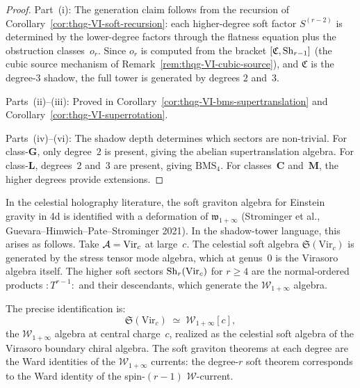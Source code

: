 \begin{proof}
Part~(i): The generation claim follows from the recursion of
Corollary~\ref{cor:thqg-VI-soft-recursion}: each higher-degree
soft factor $S^{(r-2)}$ is determined by the lower-degree factors
through the flatness equation plus the obstruction
classes~$o_r$. Since $o_r$ is computed from the bracket
$[\mathfrak{C}, \operatorname{Sh}_{r-1}]$ (the cubic source mechanism of
Remark~\ref{rem:thqg-VI-cubic-source}), and $\mathfrak{C}$ is
the degree-$3$ shadow, the full tower is generated by degrees $2$
and~$3$.

Parts~(ii)--(iii): Proved in
Corollary~\ref{cor:thqg-VI-bms-supertranslation} and
Corollary~\ref{cor:thqg-VI-superrotation}.

Parts~(iv)--(vi): The shadow depth determines which sectors are
non-trivial. For class-$\mathbf{G}$, only degree~$2$ is present,
giving the abelian supertranslation algebra. For
class-$\mathbf{L}$, degrees~$2$ and~$3$ are present, giving
$\mathrm{BMS}_4$. For classes~$\mathbf{C}$ and~$\mathbf{M}$,
the higher degrees provide extensions.
\end{proof}

\begin{remark}
\label{rem:thqg-VI-w-infinity}
In the celestial holography literature, the soft graviton algebra
for Einstein gravity in 4d is identified with a deformation of
$\mathfrak{w}_{1+\infty}$ (Strominger et al.,
Guevara--Himwich--Pate--Strominger 2021). In the shadow-tower
language, this arises as follows. Take $\mathcal{A} = \mathrm{Vir}_c$
at large~$c$. The celestial soft algebra $\mathfrak{S}(\mathrm{Vir}_c)$
is generated by the stress tensor mode algebra, which at genus~$0$
is the Virasoro algebra itself. The higher soft sectors
$\operatorname{Sh}_r(\mathrm{Vir}_c)$ for $r \geq 4$ are the normal-ordered
products $:T^{r-1}:$ and their descendants, which generate the
$\mathcal{W}_{1+\infty}$ algebra.

The precise identification is:
\begin{equation}\label{eq:thqg-VI-w-infinity-identification}
\mathfrak{S}(\mathrm{Vir}_c)
\;\simeq\;
\mathcal{W}_{1+\infty}[c],
\end{equation}
the $\mathcal{W}_{1+\infty}$ algebra at central charge~$c$,
realized as the celestial soft algebra of the Virasoro
boundary chiral algebra. The soft graviton theorems at each
degree are the Ward identities of the $\mathcal{W}_{1+\infty}$
currents: the degree-$r$ soft theorem corresponds to the
Ward identity of the spin-$(r-1)$ $\mathcal{W}$-current.
\end{remark}

